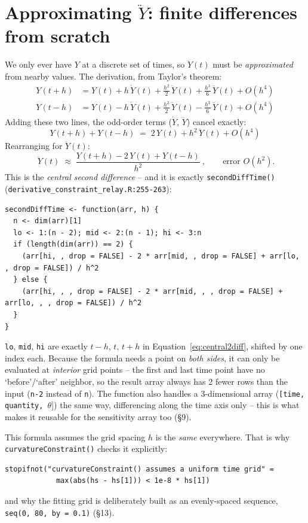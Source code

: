 \documentclass[11pt]{article}
\newcommand{\code}[1]{\texttt{#1}}
\newcommand{\file}[1]{\textcolor{black!60}{\texttt{#1}}}
\begin{document}
\section{Approximating $\ddot Y$: finite differences from scratch}

We only ever have $Y$ at a discrete set of times, so $\ddot Y(t)$ must be
\emph{approximated} from nearby values. The derivation, from Taylor's
theorem:
\begin{align}
  Y(t+h) &= Y(t) + h\,\dot Y(t) + \tfrac{h^2}{2}\,\ddot Y(t) + \tfrac{h^3}{6}\,\dddot Y(t) + O(h^4) \\
  Y(t-h) &= Y(t) - h\,\dot Y(t) + \tfrac{h^2}{2}\,\ddot Y(t) - \tfrac{h^3}{6}\,\dddot Y(t) + O(h^4)
\end{align}
Adding these two lines, the odd-order terms ($\dot Y$, $\dddot Y$) cancel
exactly:
\begin{equation}
  Y(t+h) + Y(t-h) \;=\; 2\,Y(t) + h^2\,\ddot Y(t) + O(h^4)
\end{equation}
Rearranging for $\ddot Y(t)$:
\begin{equation}
  \boxed{\ \ddot Y(t) \;\approx\; \frac{Y(t+h) - 2\,Y(t) + Y(t-h)}{h^2}\ },
  \qquad \text{error } O(h^2).
  \label{eq:central2diff}
\end{equation}
This is the \emph{central second difference} -- and it is exactly
\code{secondDiffTime()} (\file{derivative\_constraint\_relay.R:255-263}):
\begin{lstlisting}
secondDiffTime <- function(arr, h) {
  n <- dim(arr)[1]
  lo <- 1:(n - 2); mid <- 2:(n - 1); hi <- 3:n
  if (length(dim(arr)) == 2) {
    (arr[hi, , drop = FALSE] - 2 * arr[mid, , drop = FALSE] + arr[lo, , drop = FALSE]) / h^2
  } else {
    (arr[hi, , , drop = FALSE] - 2 * arr[mid, , , drop = FALSE] + arr[lo, , , drop = FALSE]) / h^2
  }
}
\end{lstlisting}
\code{lo}, \code{mid}, \code{hi} are exactly $t-h$, $t$, $t+h$ in
Equation~\eqref{eq:central2diff}, shifted by one index each. Because the
formula needs a point on \emph{both sides}, it can only be evaluated at
\emph{interior} grid points -- the first and last time point have no
`before'/`after' neighbor, so the result array always has 2 fewer rows than
the input (\code{n-2} instead of \code{n}). The function also handles a
3-dimensional array (\code{[time, quantity, }$\theta${]}) the same way,
differencing along the time axis only -- this is what makes it reusable for
the sensitivity array too (\S9).

This formula assumes the grid spacing $h$ is the \emph{same} everywhere.
That is why \code{curvatureConstraint()} checks it explicitly:
\begin{lstlisting}
stopifnot("curvatureConstraint() assumes a uniform time grid" =
            max(abs(hs - hs[1])) < 1e-8 * hs[1])
\end{lstlisting}
and why the fitting grid is deliberately built as an evenly-spaced sequence,
\code{seq(0, 80, by = 0.1)} (\S13).
\end{document}
